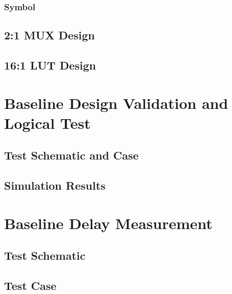 \documentclass[12pt]{article}
\begin{document}
\subsubsection*{Symbol}



\newpage

\subsection{2:1 MUX Design}



\newpage

\subsection{16:1 LUT Design}



\newpage

\section{Baseline Design Validation and Logical Test}
\subsection{Test Schematic and Case}



\newpage

\subsection{Simulation Results}



\newpage

\section{Baseline Delay Measurement}
\subsection{Test Schematic}



\newpage

\subsection{Test Case}
\end{document}
